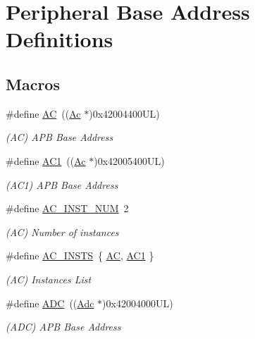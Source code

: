 \hypertarget{group___s_a_m_d21_g15_l__base}{}\section{Peripheral Base Address Definitions}
\label{group___s_a_m_d21_g15_l__base}
\subsection*{Macros}
\begin{DoxyCompactItemize}
\item 
\#define \mbox{\hyperlink{group___s_a_m_d21_g15_l__base_ga67d1a34c515736c571484ec2a3543da5}{AC}}~((\mbox{\hyperlink{struct_ac}{Ac}}       $\ast$)0x42004400\+U\+L)
\begin{DoxyCompactList}\small\item\em (AC) A\+PB Base Address \end{DoxyCompactList}\item 
\#define \mbox{\hyperlink{group___s_a_m_d21_g15_l__base_gaae37ea25cccdac03dea26df427df9cf4}{A\+C1}}~((\mbox{\hyperlink{struct_ac}{Ac}}       $\ast$)0x42005400\+U\+L)
\begin{DoxyCompactList}\small\item\em (A\+C1) A\+PB Base Address \end{DoxyCompactList}\item 
\#define \mbox{\hyperlink{group___s_a_m_d21_g15_l__base_ga4bb4da47440a75059a698577c3038483}{A\+C\+\_\+\+I\+N\+S\+T\+\_\+\+N\+UM}}~2
\begin{DoxyCompactList}\small\item\em (AC) Number of instances \end{DoxyCompactList}\item 
\#define \mbox{\hyperlink{group___s_a_m_d21_g15_l__base_ga02e4d15d1fb2a4b3b8440ce6ffede047}{A\+C\+\_\+\+I\+N\+S\+TS}}~\{ \mbox{\hyperlink{group___s_a_m_d21_j18_a__base_ga67d1a34c515736c571484ec2a3543da5}{AC}}, \mbox{\hyperlink{group___s_a_m_d21_g16_l__base_gaae37ea25cccdac03dea26df427df9cf4}{A\+C1}} \}
\begin{DoxyCompactList}\small\item\em (AC) Instances List \end{DoxyCompactList}\item 
\#define \mbox{\hyperlink{group___s_a_m_d21_g15_l__base_ga54d148b91f3d356713f7e367a2243bea}{A\+DC}}~((\mbox{\hyperlink{struct_adc}{Adc}}      $\ast$)0x42004000\+U\+L)
\begin{DoxyCompactList}\small\item\em (A\+DC) A\+PB Base Address \end{DoxyCompactList}\item 

\end{DoxyCompactItemize}
